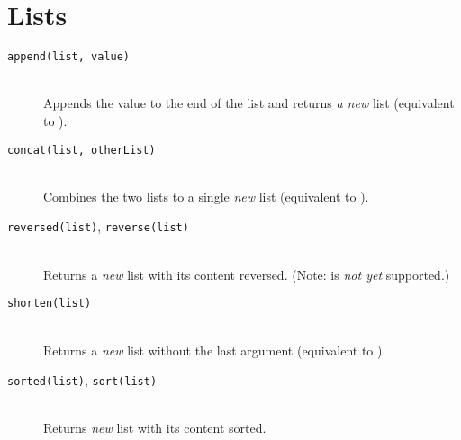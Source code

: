 \section{Lists}
\begin{description}
\item[\texttt{append(list, value)}] \hfill \\
	Appends the value to the end of the list and returns \emph{a new} list (equivalent to ).
\item[\texttt{concat(list, otherList)}] \hfill \\
	Combines the two lists to a single \emph{new} list (equivalent to ).
\item[\texttt{reversed(list)}, \texttt{reverse(list)}] \hfill \\
	Returns a \emph{new} list with its content reversed. (Note:  is \emph{not yet} supported.)
\item[\texttt{shorten(list)}] \hfill \\
	Returns a \emph{new} list without the last argument (equivalent to ).
\item[\texttt{sorted(list)}, \texttt{sort(list)}] \hfill \\
	Returns \emph{new} list with its content sorted.
\end{description}


